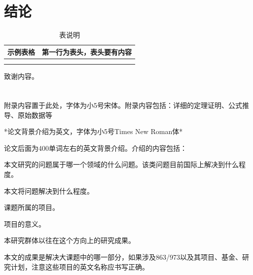 \documentclass{cjc}
\begin{document}
\section{结论}

\begin{table}[htb]
  \centering
  \caption{表说明}
  \small
  \begin{tabular}{cc}
    \toprule
    示例表格 & 第一行为表头，表头要有内容 \\
    \midrule
             &                            \\
    \midrule
             &                            \\
    \bottomrule
  \end{tabular}
\end{table}


\begin{acknowledgments}
  致谢内容。
\end{acknowledgments}


\nocite{*}





\newpage

\appendix

\section{}

附录内容置于此处，字体为小5号宋体。附录内容包括：详细的定理证明、公式推导、原始数据等


\makebiographies


\begin{background}
  *论文背景介绍为英文，字体为小5号Times New Roman体*

  论文后面为400单词左右的英文背景介绍。介绍的内容包括：

  本文研究的问题属于哪一个领域的什么问题。该类问题目前国际上解决到什么程度。

  本文将问题解决到什么程度。

  课题所属的项目。

  项目的意义。

  本研究群体以往在这个方向上的研究成果。

  本文的成果是解决大课题中的哪一部分，如果涉及863/973以及其项目、基金、研究计划，注意这些项目的英文名称应书写正确。
\end{background}
\end{document}
